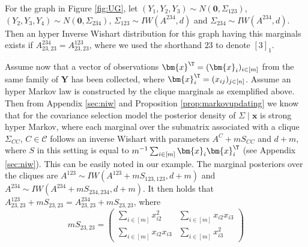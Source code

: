 For the graph in Figure \ref{fig:UG}, let $(Y_1,Y_2,Y_3)\sim N(\bm{0},\Sigma_{123})$, $(Y_2,Y_3,Y_4)\sim N(\bm{0},\Sigma_{234})$, $\Sigma_{123}\sim IW(A^{234},d)$ and $\Sigma_{234}\sim IW(A^{234},d)$. Then an hyper Inverse Wishart distribution for this graph having this marginals exists if $A^{234}_{23,23}=A^{123}_{23,23}$, where we used the shorthand $23$ to denote $[3]_1$.

Assume now that a vector of observations $\bm{x}^\T=(\bm{x}_i)_{i\in[m]}$ from the same family of $\bm{Y}$ has been collected, where $\bm{x}_i^\T=(x_{ij})_{j\in[n]}$. Assume an hyper Markov law is constructed by the clique marginals as exemplified above. Then from Appendix \ref{sec:niw} and Proposition \ref{prop:markovupdating} we know that for the covariance selection model the posterior density of $\Sigma\;|\;\bm{x}$ is strong hyper Markov, where each marginal over the submatrix associated with a clique $\Sigma_{CC}$, $C\in\mathcal{C}$ follows an inverse Wishart with parameters $A^C+mS_{CC}$ and $d+m$, where $S$ in this setting is equal to $m^{-1}\sum_{i\in[m]}\bm{x}_i\bm{x}_i^\T$ (see Appendix \ref{sec:niw}). This can be easily noted in our example. The marginal posteriors over the cliques are $A^{123}\sim IW(A^{123}+mS_{123,123},d+m)$ and $A^{234}\sim IW(A^{234}+mS_{234,234},d+m)$. It then holds that $A^{123}_{23,23}+mS_{23,23}=A^{234}_{23,23}+mS_{23,23}$, where
\begin{equation}
\label{stica}
mS_{23,23}=\left(
\begin{array}{cc}
\sum_{i\in[m]}x_{i2}^2&\sum_{i\in[m]}x_{i2}x_{i3}\\
\sum_{i\in[m]}x_{i2}x_{i3}&\sum_{i\in[m]}x_{i3}^2
\end{array}
\right)
\end{equation} 
